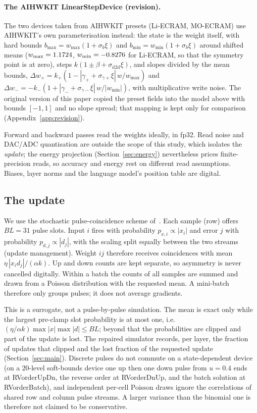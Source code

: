\paragraph{The AIHWKIT LinearStepDevice (revision).} The two devices taken from AIHWKIT presets (Li-ECRAM, MO-ECRAM) use
AIHWKIT's own parameterisation instead: the state is the weight itself, with hard bounds $b_{\max}=w_{\max}(1+\sigma_b\xi)$ and
$b_{\min}=w_{\min}(1+\sigma_b\xi)$ around shifted means ($w_{\max}=1.1724$, $w_{\min}=-0.8276$ for Li-ECRAM, so that the
symmetry point is at zero), steps $k(1\pm\beta+\sigma_{\mathrm{d2d}}\xi)$, and slopes divided by the mean bounds,
$\Delta w_+=k_+(1-|\gamma_++\sigma_{\gamma+}\xi|\,w/w_{\max})$ and $\Delta w_-=-k_-(1+|\gamma_-+\sigma_{\gamma-}\xi|\,w/|w_{\min}|)$,
with multiplicative write noise. The original version of this paper copied the preset fields into the model above with bounds
$[-1,1]$ and no slope spread; that mapping is kept only for comparison (Appendix~\ref{app:revision}).

Forward and backward passes read the weights ideally, in fp32. Read noise and DAC/ADC quantisation are outside the scope of this
study, which isolates the \emph{update}; the energy projection (Section~\ref{sec:energy}) nevertheless prices finite-precision
reads, so accuracy and energy rest on different read assumptions. Biases, layer norms and the language model's position
table are digital.

\subsection{The update}\label{sec:update}
We use the stochastic pulse-coincidence scheme of~\cite{gokmen2016}. Each sample (row) offers $BL=31$ pulse slots. Input $i$
fires with probability $p_{x,i}\propto|x_i|$ and error $j$ with probability $p_{d,j}\propto|d_j|$, with the scaling split equally
between the two streams (update management). Weight $ij$ therefore receives coincidences with mean
$\eta\,|x_i d_j|/(\alpha k)$. Up and down counts are kept separate, so asymmetry is never cancelled digitally. Within a batch the
counts of all samples are summed and drawn from a Poisson distribution with the requested mean. A mini-batch therefore only
groups pulses; it does not average gradients.

This is a surrogate, not a pulse-by-pulse simulation. The mean is exact only while the largest pre-clamp slot probability is at
most one, i.e.\ $(\eta/\alpha k)\max|x|\max|d|\le BL$; beyond that the probabilities are clipped and part of the update is lost.
The repaired simulator records, per layer, the fraction of updates that clipped and the lost fraction of the requested update
(Section~\ref{sec:main}). Discrete pulses do not commute on a state-dependent device (on a 20-level soft-bounds device one up
then one down pulse from $u=0.4$ ends at RVorderUpDn, the reverse order at RVorderDnUp, and the batch solution at RVorderBatch), and independent
per-cell Poisson draws ignore the correlations of shared row and column pulse streams. A larger variance than the binomial one
is therefore not claimed to be conservative.

